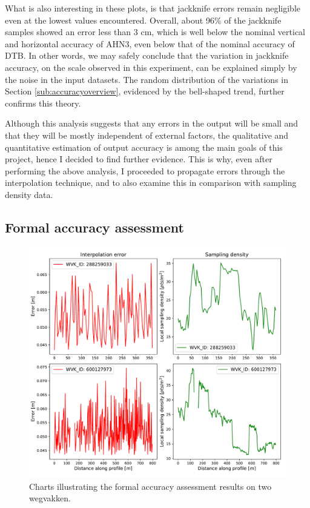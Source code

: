 What is also interesting in these plots, is that jackknife errors remain negligible even at the lowest values encountered. Overall, about 96\% of the jackknife samples showed an error less than 3 cm, which is well below the nominal vertical and horizontal accuracy of AHN3, even below that of the nominal accuracy of DTB. In other words, we may safely conclude that the variation in jackknife accuracy, on the scale observed in this experiment, can be explained simply by the noise in the input datasets. The random distribution of the variations in Section \ref{sub:accuracyoverview}, evidenced by the bell-shaped trend, further confirms this theory.

Although this analysis suggests that any errors in the output will be small and that they will be mostly independent of external factors, the qualitative and quantitative estimation of output accuracy is among the main goals of this project, hence I decided to find further evidence. This is why, even after performing the above analysis, I proceeded to propagate errors through the interpolation technique, and to also examine this in comparison with sampling density data.

\subsection{Formal accuracy assessment}
\label{sub:accuracyformal}

\begin{figure}[]
    \centering
    \includegraphics[width=0.9\linewidth]{final_report/figs/formalaccuracy0.pdf}
    \caption{Charts illustrating the formal accuracy assessment results on two wegvakken.}
    \label{fig:formalaccuracy0}
\end{figure}

